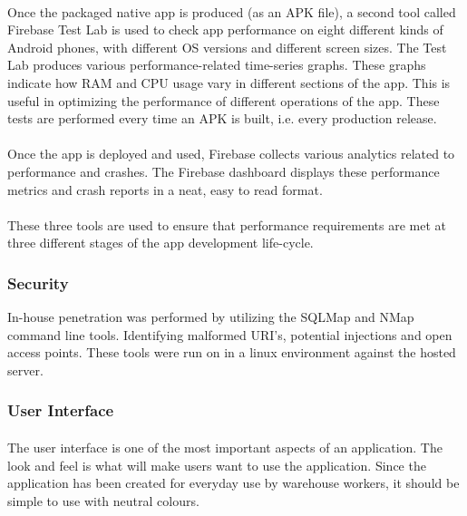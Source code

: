 \documentclass[a4paper, 11pt]{article}
\begin{document}
            \paragraph{}
            Once the packaged native app is produced (as an APK file), a second tool called Firebase Test Lab is used to check app performance on eight different kinds of Android phones, with different OS versions and different screen sizes. The Test Lab produces various performance-related time-series graphs. These graphs indicate how RAM and CPU usage vary in different sections of the app. This is useful in optimizing the performance of different operations of the app. These tests are performed every time an APK is built, i.e. every production release.
            \paragraph{}
            Once the app is deployed and used, Firebase collects various analytics related to performance and crashes. The Firebase dashboard displays these performance metrics and crash reports in a neat, easy to read format.
            \paragraph{}
            These three tools are used to ensure that performance requirements are met at three different stages of the app development life-cycle.
        
        \subsubsection{Security}
        In-house penetration was performed by utilizing the SQLMap and NMap command line tools. Identifying malformed URI's, potential injections and open access points. These tools were run on in a linux environment against the hosted server.
        
        \subsubsection{User Interface}
            \paragraph{}
            The user interface is one of the most important aspects of an application. The look and feel is what will make users want to use the application. Since the application has been created for everyday use by warehouse workers, it should be simple to use with neutral colours.
\end{document}
